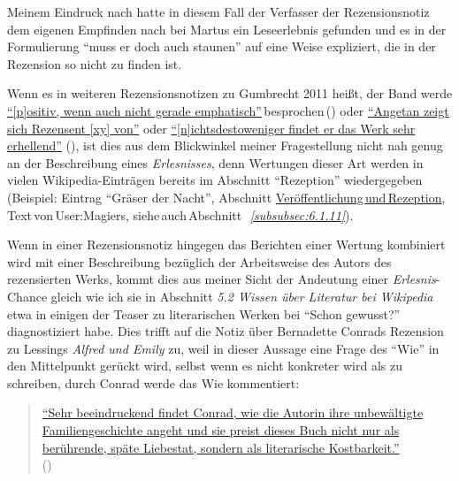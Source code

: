 \documentclass[fontsize=12pt]{scrartcl}
\begin{document}
Meinem Eindruck nach hatte in diesem Fall der Verfasser\textsuperscript{\tiny *} der Rezensionsnotiz dem eigenen Empfinden nach bei Martus ein Leseerlebnis gefunden und es in der Formulierung "`muss er doch auch staunen"' auf eine Weise expliziert, die in der Rezension so nicht zu finden ist. 

Wenn es in weiteren Rezensionsnotizen zu Gumbrecht 2011 hei{\ss}t, der Band werde \href{http://www.perlentaucher.de/buch/hans-ulrich-gumbrecht/stimmungen-lesen.html}{"`[p]ositiv, wenn auch nicht gerade emphatisch"'}\,besprochen\,(\cite{Anonym*ohneDatum2}) oder \href{http://www.perlentaucher.de/buch/hans-ulrich-gumbrecht/stimmungen-lesen.html}{"`Angetan zeigt sich Rezensent [xy] von"'} oder \href{http://www.perlentaucher.de/buch/hans-ulrich-gumbrecht/stimmungen-lesen.html}{"`[n]ichtsdestoweniger findet er das Werk sehr erhellend"'} (\cite{Anonym*ohneDatum5}), ist dies aus dem Blickwinkel meiner Fragestellung nicht nah genug an der Beschreibung eines \textit{Erlesnisses}, denn Wertungen dieser Art werden in vielen Wi\-ki\-pe\-dia-Eintr\"agen bereits im Abschnitt "`Rezeption"' wiedergegeben (Beispiel: Eintrag "`Gr\"aser der Nacht"', Abschnitt \href{https://de.wikipedia.org/w/index.php?title=Gr\%C3\%A4ser_der_Nacht\&oldid=136750896\#Ver.C3.B6ffentlichung_und_Rezeption}{Ver\"offentlichung\,und\,Rezeption},\,Text\,von\,\mbox{User}:Magiers, siehe\,auch\,Abschnitt\,\textit{~\ref{subsubsec:6.1.11}}).

Wenn in einer Rezensionsnotiz hingegen das Berichten einer Wertung kombiniert wird mit einer Beschreibung bez\"uglich der Arbeitsweise des Autors\textsuperscript{\tiny *} des rezensierten Werks, kommt dies aus meiner Sicht der Andeutung einer \textit{Erlesnis}-Chance gleich wie ich sie in Abschnitt \textit{5.2 Wissen \"uber Li\-te\-ra\-tur bei Wi\-ki\-pe\-dia} etwa in einigen der Teaser zu li\-te\-ra\-rischen Werken bei "`Schon gewusst?"' diagnostiziert habe. Dies trifft auf die Notiz \"uber Bernadette Conrads Rezension zu Lessings \textit{Alfred und Emily} zu, weil in dieser Aussage eine Frage des "`Wie"' in den Mittelpunkt ger\"uckt wird, \mbox{selbst} wenn es nicht konkreter wird als zu schrei\-ben, durch Conrad werde das Wie kommentiert:

\singlespacing
\begin{quote}
\href{http://www.perlentaucher.de/buch/doris-lessing/alfred-und-emily.html}{"`Sehr beeindruckend findet Conrad, wie die Autorin ihre unbew\"altigte Familiengeschichte angeht und sie preist dieses Buch nicht nur als be\-r\"uh\-ren\-de, sp\"ate Liebestat, sondern als li\-te\-ra\-rische Kostbarkeit."'}\\ (\cite{Anonym*ohneDatum4})
\end{quote}
\onehalfspacing
\end{document}
